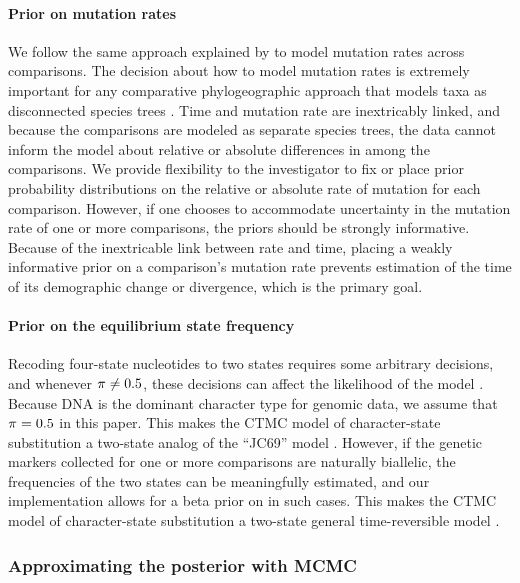 \paragraph{Prior on mutation rates}
We follow the same approach explained by \citet{Oaks2018ecoevolity} to model
mutation rates across comparisons.
The decision about how to model mutation rates is extremely important for any
comparative phylogeographic approach that models taxa as disconnected
species trees
\citep[\fig{}~\ref{fig:modelCartoon}; e.g.,][]{Hickerson2006,Hickerson2007,Huang2011,Chan2014,Oaks2014dpp,Xue2015,Burbrink2016,Xue2017,Gehara2017,Oaks2018ecoevolity}.
Time and mutation rate are inextricably linked, and because
the comparisons are modeled as separate species trees, the data cannot
inform the model about relative or absolute differences in \murate among the
comparisons.
We provide flexibility to the investigator to fix or place prior probability
distributions on the relative or absolute rate of mutation for each comparison.
However, if one chooses to accommodate uncertainty in the mutation rate of one
or more comparisons, the priors should be strongly informative.
Because of the inextricable link between rate and time,
placing a weakly informative prior on a comparison's mutation rate prevents
estimation of the time of its demographic change or divergence,
which is the primary goal.

\paragraph{Prior on the equilibrium state frequency}
Recoding four-state nucleotides to two states requires some arbitrary
decisions, and whenever $\pi_{} \neq 0.5$, these decisions can affect
the likelihood of the model \citep{Oaks2018ecoevolity}.
Because DNA is the dominant character type for genomic data, we assume that
$\pi_{} = 0.5$ in this paper.
This makes the CTMC model of character-state substitution a two-state analog of
the ``JC69'' model \citep{JC1969}.
However, if the genetic markers collected for one or more comparisons are naturally
biallelic, the frequencies of the two states can be meaningfully estimated, and
our implementation allows for a beta prior on \gfreq in such cases.
This makes the CTMC model of character-state substitution a two-state general
time-reversible model \citep{Tavare1986}.

\subsubsection{Approximating the posterior with MCMC}

